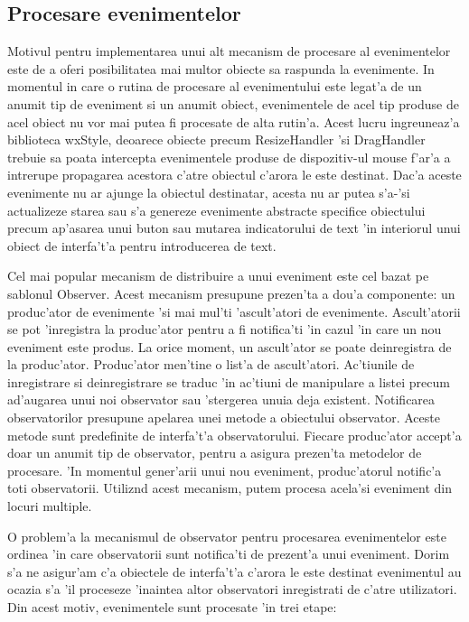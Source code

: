 \subsection{Procesare evenimentelor}
Motivul pentru implementarea unui alt mecanism de procesare al evenimentelor este de a oferi posibilitatea mai multor obiecte sa raspunda la evenimente. In momentul in care o rutina de procesare al evenimentului este legat'a de un anumit tip de eveniment si un anumit obiect, evenimentele de acel tip produse de acel obiect nu vor mai putea fi procesate de alta rutin'a. Acest lucru ingreuneaz'a biblioteca wxStyle, deoarece obiecte precum ResizeHandler 'si DragHandler trebuie sa poata intercepta evenimentele produse de dispozitiv-ul mouse f'ar'a a intrerupe propagarea acestora c'atre obiectul c'arora le este destinat. Dac'a aceste evenimente nu ar ajunge la obiectul destinatar, acesta nu ar putea s'a-'si actualizeze starea sau s'a genereze evenimente abstracte specifice obiectului precum ap'asarea unui buton sau mutarea indicatorului de text 'in interiorul unui obiect de interfa't'a pentru introducerea de text.

Cel mai popular mecanism de distribuire a unui eveniment este cel bazat pe sablonul Observer. Acest mecanism presupune prezen'ta a dou'a componente: un produc'ator de evenimente 'si mai mul'ti 'ascult'atori de evenimente. Ascult'atorii se pot 'inregistra la produc'ator pentru a fi notifica'ti 'in cazul 'in care un nou eveniment este produs. La orice moment, un ascult'ator se poate deinregistra de la produc'ator. Produc'ator men'tine o list'a de ascult'atori. Ac'tiunile de inregistrare si deinregistrare se traduc 'in ac'tiuni de manipulare a listei precum ad'augarea unui noi observator sau 'stergerea unuia deja existent. Notificarea observatorilor presupune apelarea unei metode a obiectului observator. Aceste metode sunt predefinite de interfa't'a observatorului. Fiecare produc'ator accept'a doar un anumit tip de observator, pentru a asigura prezen'ta metodelor de procesare. 'In momentul gener'arii unui nou eveniment, produc'atorul notific'a toti observatorii. Utiliz{\ia}nd acest mecanism, putem procesa acela'si eveniment din locuri multiple.

O problem'a la mecanismul de observator pentru procesarea evenimentelor este ordinea 'in care observatorii sunt notifica'ti de prezent'a unui eveniment. Dorim s'a ne asigur'am c'a obiectele de interfa't'a c'arora le este destinat evenimentul au ocazia s'a 'il proceseze 'inaintea altor observatori inregistrati de c'atre utilizatori. Din acest motiv, evenimentele sunt procesate 'in trei etape:

